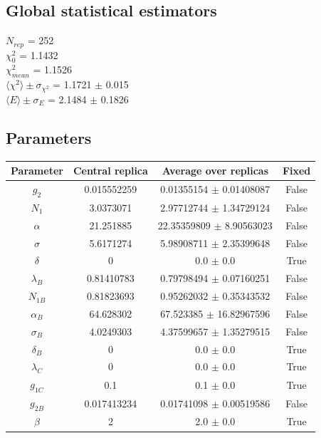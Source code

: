 \documentclass[
]{article}
\begin{document}
\hypertarget{global-statistical-estimators}{%
\subsection{Global statistical
estimators}\label{global-statistical-estimators}}

\(N_{rep}\) = 252\\
\(\chi_{0}^2\) = 1.1432\\
\(\chi_{mean}^2\) = 1.1526\\
\(\langle\chi^2\rangle \pm \sigma_{\chi^2}\) = 1.1721 \(\pm\) 0.015\\
\(\langle E \rangle \pm \sigma_{E}\) = 2.1484 \(\pm\) 0.1826

\hypertarget{parameters}{%
\subsection{Parameters}\label{parameters}}

\begin{longtable}[]{@{}cccc@{}}
\toprule
Parameter & Central replica & Average over replicas &
Fixed\tabularnewline
\midrule
\endhead
\(g_2\) & 0.015552259 & 0.01355154 \(\pm\) 0.01408087 &
False\tabularnewline
\(N_1\) & 3.0373071 & 2.97712744 \(\pm\) 1.34729124 &
False\tabularnewline
\(\alpha\) & 21.251885 & 22.35359809 \(\pm\) 8.90563023 &
False\tabularnewline
\(\sigma\) & 5.6171274 & 5.98908711 \(\pm\) 2.35399648 &
False\tabularnewline
\(\delta\) & 0 & 0.0 \(\pm\) 0.0 & True\tabularnewline
\(\lambda_B\) & 0.81410783 & 0.79798494 \(\pm\) 0.07160251 &
False\tabularnewline
\(N_{1B}\) & 0.81823693 & 0.95262032 \(\pm\) 0.35343532 &
False\tabularnewline
\(\alpha_B\) & 64.628302 & 67.523385 \(\pm\) 16.82967596 &
False\tabularnewline
\(\sigma_B\) & 4.0249303 & 4.37599657 \(\pm\) 1.35279515 &
False\tabularnewline
\(\delta_B\) & 0 & 0.0 \(\pm\) 0.0 & True\tabularnewline
\(\lambda_C\) & 0 & 0.0 \(\pm\) 0.0 & True\tabularnewline
\(g_{1C}\) & 0.1 & 0.1 \(\pm\) 0.0 & True\tabularnewline
\(g_{2B}\) & 0.017413234 & 0.01741098 \(\pm\) 0.00519586 &
False\tabularnewline
\(\beta\) & 2 & 2.0 \(\pm\) 0.0 & True\tabularnewline
\bottomrule
\end{longtable}
\end{document}

